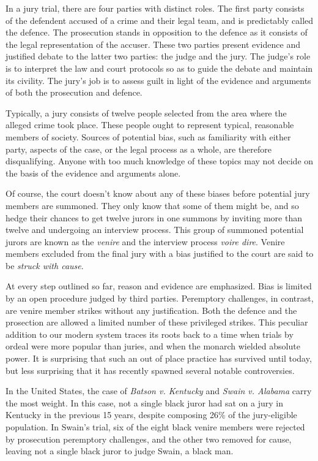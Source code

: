 \documentclass[12pt]{article}
\begin{document}
In a jury trial, there are four parties with distinct roles. The first party consists of the defendent accused of a crime and their legal team, and is predictably called the defence. The prosecution stands in opposition to the defence as it consists of the legal representation of the accuser. These two parties present evidence and justified debate to the latter two parties: the judge and the jury. The judge's role is to interpret the law and court protocols so as to guide the debate and maintain its civility. The jury's job is to assess guilt in light of the evidence and arguments of both the prosecution and defence.

Typically, a jury consists of twelve people selected from the area where the alleged crime took place. These people ought to represent typical, reasonable members of society. Sources of potential bias, such as familiarity with either party, aspects of the case, or the legal process as a whole, are therefore disqualifying. Anyone with too much knowledge of these topics may not decide on the basis of the evidence and arguments alone.

Of course, the court doesn't know about any of these biases before potential jury members are summoned. They only know that some of them might be, and so hedge their chances to get twelve jurors in one summons by inviting more than twelve and undergoing an interview process. This group of summoned potential jurors are known as the \emph{venire} and the interview process \emph{voire dire}. Venire members excluded from the final jury with a bias justified to the court are said to be \emph{struck with cause}.

At every step outlined so far, reason and evidence are emphasized. Bias is limited by an open procedure judged by third parties. Peremptory challenges, in contrast, are venire member strikes without any justification. Both the defence and the prosection are allowed a limited number of these privileged strikes. This peculiar addition to our modern system traces its roots back to a time when trials by ordeal were more popular than juries, and when the monarch wielded absolute power. It is surprising that such an out of place practice has survived until today, but less surprising that it has recently spawned several notable controversies.

In the United States, the case of \emph{Batson v. Kentucky} and \emph{Swain v. Alabama} carry the most weight. In this case, not a single black juror had sat on a jury in Kentucky in the previous 15 years, despite composing 26\% of the jury-eligible population. In Swain's trial, six of the eight black venire members were rejected by prosecution peremptory challenges, and the other two removed for cause, leaving not a single black juror to judge Swain, a black man.
\end{document}

